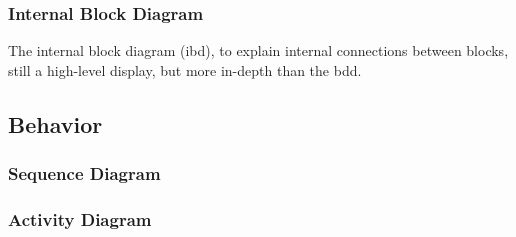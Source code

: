 \subsubsection{Internal Block Diagram}
The internal block diagram (ibd), to explain internal connections between blocks, still a high-level display, but more in-depth than the bdd.




\subsection{Behavior}

\blindtext %

\subsubsection{Sequence Diagram}

\blindtext %

\subsubsection{Activity Diagram}

\blindtext %
